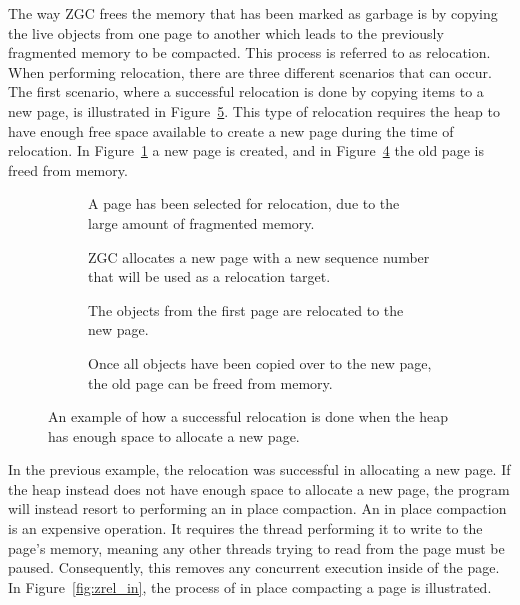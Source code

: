 The way ZGC frees the memory that has been marked as garbage is by copying the live objects from one page to another which leads to the previously fragmented memory to be compacted. This process is referred to as relocation. When performing relocation, there are three different scenarios that can occur. The first scenario, where a successful relocation is done by copying items to a new page, is illustrated in Figure~\ref{fig:zrel_new}. This type of relocation requires the heap to have enough free space available to create a new page during the time of relocation. In Figure~\ref*{fig:zrel_new1} a new page is created, and in Figure~\ref*{fig:zrel_new3} the old page is freed from memory.

\begin{figure}[H]
    \centering
    \begin{subfigure}[t]{.2\textwidth}
        \centering
        
        \caption{A page has been selected for relocation, due to the large amount of fragmented memory.}
        \label{fig:zrel_new1}
    \end{subfigure}%
    \hfill\vline\hfill
    \begin{subfigure}[t]{.2\textwidth}
        \centering
        
        \caption{ZGC allocates a new page with a new sequence number that will be used as a relocation target.}
        \label{fig:zrel_new2}
    \end{subfigure}%
    \hfill\vline\hfill
    \begin{subfigure}[t]{.2\textwidth}
        \centering
        
        \caption{The objects from the first page are relocated to the new page.}
        \label{fig:zrel_new3}
    \end{subfigure}%
    \hfill\vline\hfill
    \begin{subfigure}[t]{.2\textwidth}
        \centering
        
        \caption{Once all objects have been copied over to the new page, the old page can be freed from memory.}
        \label{fig:zrel_new3}
    \end{subfigure}%
    \caption{An example of how a successful relocation is done when the heap has enough space to allocate a new page.}
    \label{fig:zrel_new}
\end{figure}

In the previous example, the relocation was successful in allocating a new page. If the heap instead does not have enough space to allocate a new page, the program will instead resort to performing an in place compaction. An in place compaction is an expensive operation. It requires the thread performing it to write to the page's memory, meaning any other threads trying to read from the page must be paused. Consequently, this removes any concurrent execution inside of the page. In Figure~\ref{fig:zrel_in}, the process of in place compacting a page is illustrated. 

